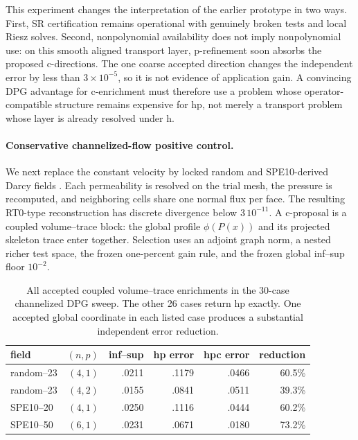 \documentclass[11pt]{article}
\numberwithin{algorithm}{section}
\theoremstyle{definition}\newtheorem{definition}[theorem]{Definition}
\theoremstyle{remark}\newtheorem{remark}[theorem]{Remark}
\begin{document}
This experiment changes the interpretation of the earlier prototype in two
ways. First, SR certification remains operational with genuinely broken tests
and local Riesz solves. Second, nonpolynomial availability does not imply
nonpolynomial use: on this smooth aligned transport layer, p-refinement soon
absorbs the proposed c-directions. The one coarse accepted direction changes
the independent error by less than $3\times10^{-5}$, so it is not evidence of
application gain. A convincing DPG advantage for c-enrichment must therefore
use a problem whose operator-compatible structure remains expensive for hp,
not merely a transport problem whose layer is already resolved under h.

\paragraph{Conservative channelized-flow positive control.}
We next replace the constant velocity by locked random and SPE10-derived Darcy
fields \cite{christieblunt2001}. Each permeability is resolved on the trial
mesh, the pressure is recomputed, and neighboring cells share one normal flux
per face. The resulting RT0-type reconstruction has discrete divergence below
$3\,10^{-11}$. A c-proposal is a coupled volume--trace block: the global
profile $\phi(P(x))$ and its projected skeleton trace enter together.
Selection uses an adjoint graph norm, a nested richer test space, the frozen
one-percent gain rule, and the frozen global inf--sup floor $10^{-2}$.

\begin{table}[t]
\centering
\caption{All accepted coupled volume--trace enrichments in the 30-case
channelized DPG sweep. The other 26 cases return hp exactly. One accepted
global coordinate in each listed case produces a substantial independent
error reduction.}
\begin{tabular}{lrrrrr}
\toprule
field & $(n,p)$ & inf--sup & hp error & hpc error & reduction\\
\midrule
random--23 & $(4,1)$ & .0211 & .1179 & .0466 & 60.5\%\\
random--23 & $(4,2)$ & .0155 & .0841 & .0511 & 39.3\%\\
SPE10--20  & $(4,1)$ & .0250 & .1116 & .0444 & 60.2\%\\
SPE10--50  & $(6,1)$ & .0231 & .0671 & .0180 & 73.2\%\\
\bottomrule
\end{tabular}
\label{tab:channelized-broken-dpg}
\end{table}
\end{document}
